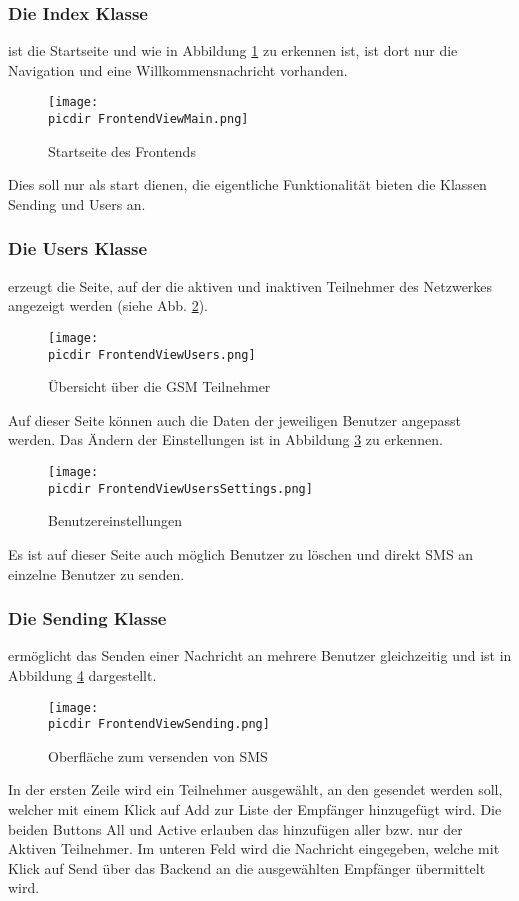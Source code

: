 \subsubsection*{Die Index Klasse} ist die Startseite und wie in Abbildung \ref{fig:view_main} zu erkennen ist, ist dort nur die Navigation und eine Willkommensnachricht vorhanden. 
\begin{figure}[h]
	\centering
	\texttt{[image: \\picdir FrontendViewMain.png]}
	\caption{Startseite des Frontends}
	\label{fig:view_main}
\end{figure}
Dies soll nur als start dienen, die eigentliche Funktionalität bieten die Klassen Sending und Users an. 

\FloatBarrier
\subsubsection*{Die Users Klasse} erzeugt die Seite, auf der die aktiven und inaktiven Teilnehmer des Netzwerkes angezeigt werden (siehe Abb. \ref{fig:view_user}). 
\begin{figure}[h]
	\centering
	\texttt{[image: \\picdir FrontendViewUsers.png]}
	\caption{Übersicht über die GSM Teilnehmer}
	\label{fig:view_user}
\end{figure}
Auf dieser Seite können auch die Daten der jeweiligen Benutzer angepasst werden. Das Ändern der Einstellungen ist in Abbildung \ref{fig:view_user_settings} zu erkennen.
\begin{figure}[h]
	\centering
	\texttt{[image: \\picdir FrontendViewUsersSettings.png]}
	\caption{Benutzereinstellungen}
	\label{fig:view_user_settings}
\end{figure}
Es ist auf dieser Seite auch möglich Benutzer zu löschen und direkt SMS an einzelne Benutzer zu senden.

\FloatBarrier
\subsubsection*{Die Sending Klasse}
ermöglicht das Senden einer Nachricht an mehrere Benutzer gleichzeitig und ist in Abbildung \ref{fig:view_sending} dargestellt.
\begin{figure}[h!]
	\centering
	\texttt{[image: \\picdir FrontendViewSending.png]}
	\caption{Oberfläche zum versenden von SMS}
	\label{fig:view_sending}
\end{figure}
In der ersten Zeile wird ein Teilnehmer ausgewählt, an den gesendet werden soll, welcher mit einem Klick auf Add zur Liste der Empfänger hinzugefügt wird. Die beiden Buttons All und Active erlauben das hinzufügen aller bzw. nur der Aktiven Teilnehmer. Im unteren Feld wird die Nachricht eingegeben, welche mit Klick auf Send über das Backend an die ausgewählten Empfänger übermittelt wird.

